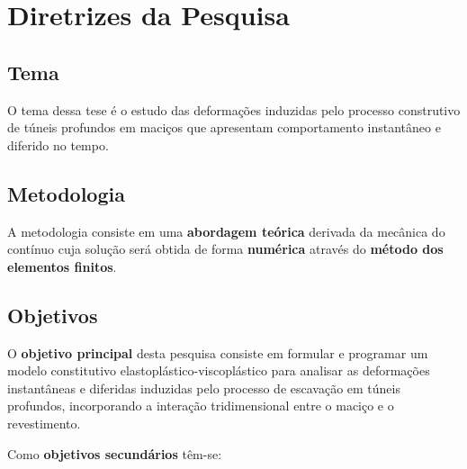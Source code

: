 \chapter{Diretrizes da Pesquisa}

\section{Tema}

O tema dessa tese é o estudo das deformações induzidas pelo processo construtivo de túneis profundos em maciços que apresentam comportamento instantâneo e diferido no tempo.

\section{Metodologia}

A metodologia consiste em uma \textbf{abordagem teórica} derivada da mecânica do contínuo cuja solução será obtida de forma \textbf{numérica} através do \textbf{método dos elementos finitos}.

\section{Objetivos}

O \textbf{objetivo principal} desta pesquisa consiste em formular e programar um modelo constitutivo elastoplástico-viscoplástico para analisar as deformações instantâneas e diferidas induzidas pelo processo de escavação em túneis profundos, incorporando a interação tridimensional entre o maciço e o revestimento.

Como \textbf{objetivos secundários} têm-se:

